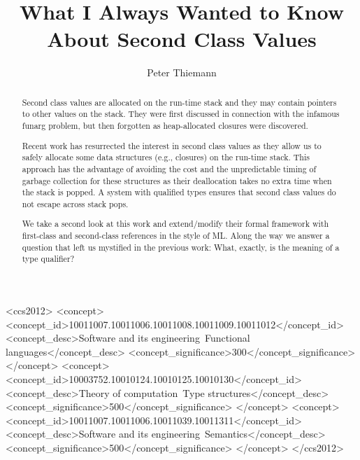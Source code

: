 \documentclass[sigplan,review,dvipsnames,screen,10pt]{acmart}
\begin{document}
\title{What I Always Wanted to Know About Second Class Values}

\author{Peter Thiemann}

\begin{abstract}
Second class values are allocated on the run-time stack and they may contain pointers
to other values on the stack. They were first discussed in connection with the
infamous funarg problem, but then forgotten as heap-allocated closures were
discovered.

Recent work has resurrected the interest in second class values as they allow us
to safely allocate some data structures (e.g., closures) on the run-time stack.
This approach has the advantage of avoiding the cost and the
unpredictable timing of garbage collection for
these structures as their deallocation takes no extra time when the
stack is popped. 
A system with qualified types ensures that second class values do not
escape across stack pops.

We take a second look at this work and extend/modify their formal framework
with first-class and second-class references in the style of ML. Along
the way we answer a question that left us mystified in the previous
work:  What, exactly, is the meaning of a type qualifier? 
\end{abstract}

\begin{CCSXML}
<ccs2012>
<concept>
<concept_id>10011007.10011006.10011008.10011009.10011012</concept_id>
<concept_desc>Software and its engineering~Functional languages</concept_desc>
<concept_significance>300</concept_significance>
</concept>
<concept>
<concept_id>10003752.10010124.10010125.10010130</concept_id>
<concept_desc>Theory of computation~Type structures</concept_desc>
<concept_significance>500</concept_significance>
</concept>
<concept>
<concept_id>10011007.10011006.10011039.10011311</concept_id>
<concept_desc>Software and its engineering~Semantics</concept_desc>
<concept_significance>500</concept_significance>
</concept>
</ccs2012>
\end{CCSXML}
\end{document}
